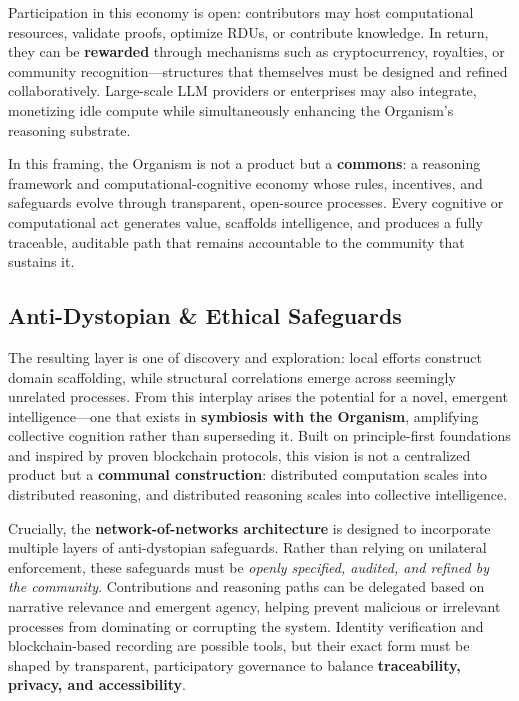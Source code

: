 \documentclass[12pt]{article}
\begin{document}
Participation in this economy is open: contributors may host computational resources, validate proofs, optimize RDUs, or contribute knowledge. In return, they can be \textbf{rewarded} through mechanisms such as cryptocurrency, royalties, or community recognition—structures that themselves must be designed and refined collaboratively. Large-scale LLM providers or enterprises may also integrate, monetizing idle compute while simultaneously enhancing the Organism’s reasoning substrate.  

In this framing, the Organism is not a product but a \textbf{commons}: a reasoning framework and computational-cognitive economy whose rules, incentives, and safeguards evolve through transparent, open-source processes. Every cognitive or computational act generates value, scaffolds intelligence, and produces a fully traceable, auditable path that remains accountable to the community that sustains it.  

\subsection{Anti-Dystopian \& Ethical Safeguards}

The resulting layer is one of discovery and exploration: local efforts construct domain scaffolding, while structural correlations emerge across seemingly unrelated processes. From this interplay arises the potential for a novel, emergent intelligence—one that exists in \textbf{symbiosis with the Organism}, amplifying collective cognition rather than superseding it. Built on principle-first foundations and inspired by proven blockchain protocols, this vision is not a centralized product but a \textbf{communal construction}: distributed computation scales into distributed reasoning, and distributed reasoning scales into collective intelligence.  

Crucially, the \textbf{network-of-networks architecture} is designed to incorporate multiple layers of anti-dystopian safeguards. Rather than relying on unilateral enforcement, these safeguards must be \textit{openly specified, audited, and refined by the community}. Contributions and reasoning paths can be delegated based on narrative relevance and emergent agency, helping prevent malicious or irrelevant processes from dominating or corrupting the system. Identity verification and blockchain-based recording are possible tools, but their exact form must be shaped by transparent, participatory governance to balance \textbf{traceability, privacy, and accessibility}.  
\end{document}
